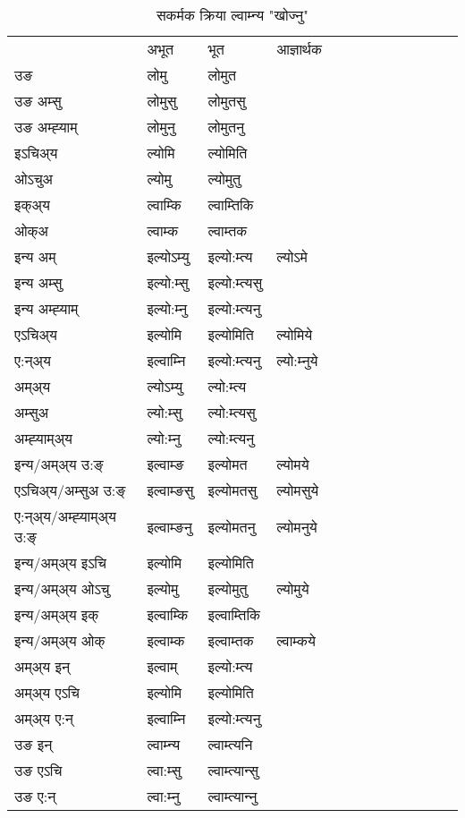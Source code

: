 \begin{table}[H]
\centering
\caption{\label{om.vt} सकर्मक क्रिया  ल्वाम्‍न्य  "खोज्नु"  }
\begin{tabular}{l|l|l|l|l|l|l|l|l|l|l|l|l}  \toprule
&अभूत & भूत & आज्ञार्थक \\ 
उङ &लोमु &लोमुत \\ 
उङ अम्सु &लोमुसु &लोमुतसु \\ 
उङ अम्ह्‍याम् &लोमुनु &लोमुतनु \\ 
इऽचिअ्य &ल्योमि &ल्योमिति   \\ 
ओऽचुअ &ल्योमु &ल्योमुतु   \\ 
इक्अ्य &ल्वाम्कि &ल्वाम्तिकि   \\ 
ओक्अ &ल्वाम्क &ल्वाम्तक   \\ 
इन्य अम् & इल्योऽम्यु  & इल्यो:म्त्य &ल्योऽमे  \\ 
इन्य अम्सु & इल्यो:म्सु  & इल्यो:म्त्यसु   \\ 
इन्य अम्ह्‍याम् & इल्यो:म्‍नु  & इल्यो:म्त्यनु   \\ 
एऽचिअ्य & इल्योमि & इल्योमिति &ल्योमिये    \\ 
ए:न्अ्य & इल्वाम्‍नि  & इल्यो:म्त्यनु &ल्यो:म्‍नुये  \\ 
अम्अ्य & ल्योऽम्यु  & ल्यो:म्त्य  \\ 
अम्सुअ & ल्यो:म्सु & ल्यो:म्त्यसु  \\ 
अम्ह्‍याम्अ्य & ल्यो:म्‍नु  & ल्यो:म्त्यनु \\ 
\midrule
इन्य/अम्अ्य उ:ङ्‌&इल्वाम्ङ & इल्योमत &ल्योमये \\ 
एऽचिअ्य/अम्सुअ उ:ङ्‌ &इल्वाम्ङसु & इल्योमतसु &ल्योमसुये \\ 
ए:न्अ्य/अम्ह्‍याम्अ्य उ:ङ्‌ &इल्वाम्ङनु & इल्योमतनु &ल्योमनुये \\ 
इन्य/अम्अ्य इऽचि & इल्योमि & इल्योमिति    \\ 
इन्य/अम्अ्य ओऽचु & इल्योमु & इल्योमुतु  &ल्योमुये  \\ 
इन्य/अम्अ्य इक् & इल्वाम्कि & इल्वाम्तिकि   \\ 
इन्य/अम्अ्य ओक् & इल्वाम्क & इल्वाम्तक  &ल्वाम्कये  \\ 
अम्अ्य इन् & इल्वाम् & इल्यो:म्त्य   \\ 
अम्अ्य एऽचि & इल्योमि & इल्योमिति    \\ 
अम्अ्य ए:न् & इल्वाम्‍नि  & इल्यो:म्त्यनु  \\ 
\midrule
उङ इन् & ल्वाम्‍न्य  & ल्वाम्त्यनि  \\ 
उङ एऽचि & ल्वा:म्सु  & ल्वाम्त्यान्सु   \\ 
उङ ए:न्& ल्वा:म्‍नु  & ल्वाम्त्यान्‍नु   \\ 
\bottomrule
\end{tabular}
\end{table}


